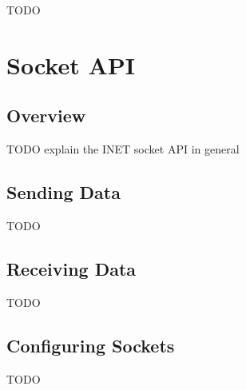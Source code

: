 \ifdraft TODO

\chapter{Socket API}
\label{cha:sockets}

\section{Overview}

TODO explain the INET socket API in general



\section{Sending Data}

TODO

\section{Receiving Data}

TODO

\section{Configuring Sockets}

TODO

\fi




